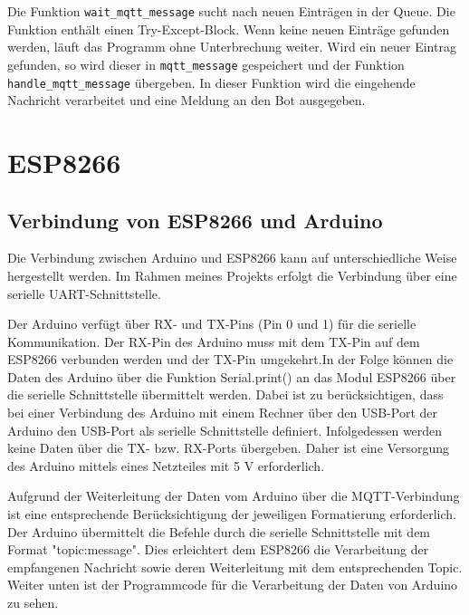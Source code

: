 \documentclass[12pt, letterpaper]{article}
\begin{document}
\par Die Funktion \texttt{wait\_mqtt\_message} sucht nach neuen Einträgen in der Queue. Die Funktion enthält einen Try-Except-Block. Wenn keine neuen Einträge gefunden werden, läuft das Programm ohne Unterbrechung weiter. Wird ein neuer Eintrag gefunden, so wird dieser in \texttt{mqtt\_message} gespeichert und der Funktion \texttt{handle\_mqtt\_message} übergeben. In dieser Funktion wird die eingehende Nachricht verarbeitet und eine Meldung an den Bot ausgegeben.
\section{ESP8266} \label{sec:esp}

\subsection[Arduino-ESP8266]{Verbindung von ESP8266 und Arduino}
\par Die Verbindung zwischen Arduino und ESP8266 kann auf unterschiedliche Weise hergestellt werden. Im Rahmen meines Projekts erfolgt die Verbindung über eine serielle UART-Schnittstelle.
\par Der Arduino verfügt über RX- und TX-Pins (Pin 0 und 1) für die serielle Kommunikation. Der RX-Pin des Arduino muss mit dem TX-Pin auf dem ESP8266 verbunden werden und der TX-Pin umgekehrt.In der Folge können die Daten des Arduino über die Funktion Serial.print() an das Modul ESP8266 über die serielle Schnittstelle übermittelt werden. Dabei ist zu berücksichtigen, dass bei einer Verbindung des Arduino mit einem Rechner über den USB-Port der Arduino den USB-Port als serielle Schnittstelle definiert. Infolgedessen werden keine Daten über die TX- bzw. RX-Ports übergeben. Daher ist eine Versorgung des Arduino mittels eines Netzteiles mit 5 V erforderlich.
\par Aufgrund der Weiterleitung der Daten vom Arduino über die MQTT-Verbindung ist eine entsprechende Berücksichtigung der jeweiligen Formatierung erforderlich. Der Arduino übermittelt die Befehle durch die serielle Schnittstelle mit dem Format "topic:message". Dies erleichtert dem ESP8266 die Verarbeitung der empfangenen Nachricht sowie deren Weiterleitung mit dem entsprechenden Topic. Weiter unten ist der Programmcode für die Verarbeitung der Daten von Arduino zu sehen. 
\end{document}
